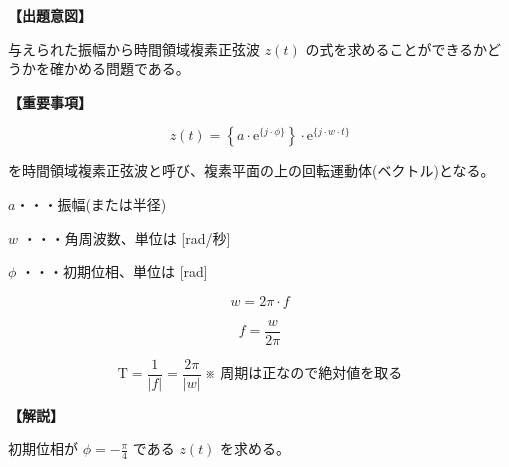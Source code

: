 \noindent \textbf{【出題意図】}

\bigskip
\noindent 与えられた振幅から時間領域複素正弦波 $z(t)$ の式を求めることができるかどうかを確かめる問題である。

\vspace{1em}
\noindent \textbf{【重要事項】}

\[
z(t) =  \left \{ a \cdot \textrm{e}^{\{j \cdot \phi\}} \right \} 
\cdot \textrm{e}^{\{j \cdot w \cdot t \}}
\]

\bigskip
\noindent を時間領域複素正弦波と呼び、複素平面の上の回転運動体(ベクトル)となる。

\bigskip
\noindent\quad  $a$・・・振幅(または半径)

\bigskip
\noindent\quad $w$ ・・・角周波数、単位は [rad/秒]

\bigskip
\noindent\quad $\phi$ ・・・初期位相、単位は [rad]

\[
w = 2\pi \cdot f
\]

\[
f = \frac{w}{2\pi} 
\]

\[
\textrm{T} = \frac{1}{|f|} = \frac{2\pi}{|w|}   \ \mbox{※ 周期は正なので絶対値を取る}
\]

\bigskip

\vspace{1em}
\noindent \textbf{【解説】}

\bigskip
\noindent 初期位相が $\phi = -\frac{\pi}{4}$ である $z(t)$ を求める。
